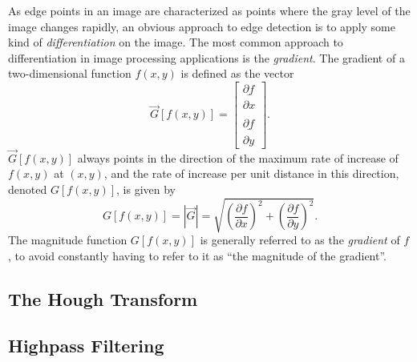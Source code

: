 As edge points in an image are characterized as points where the gray
level of the image changes rapidly, an obvious approach to edge
detection is to apply some kind of {\em differentiation\/} on the
image.  The most common approach to differentiation in image
processing applications is the {\em gradient\/}.  The gradient of a
two-dimensional function $f(x,y)$ is defined as the vector
\begin{equation}
  \vec{G}[f(x,y)]=\left[
    \begin{array}{c}
      \underline{\partial f} \\
      \partial x \\ \\
      \underline{\partial f} \\
      \partial y
    \end{array}\right]\mbox{.}
\end{equation}
$\vec{G}[f(x,y)]$ always points in the direction of the maximum rate
of increase of $f(x,y)$ at $(x,y)$, and the rate of increase per unit
distance in this direction, denoted $G[f(x,y)]$, is given by
\begin{equation}
  G[f(x,y)]=|\vec{G}|=\sqrt{(\frac{\partial f}{\partial x})^{2}+
    (\frac{\partial f}{\partial y})^{2}}\mbox{.}
\end{equation}
The magnitude function $G[f(x,y)]$ is generally referred to as the
{\em gradient\/} of $f$, to avoid constantly having to refer to it as
``the magnitude of the gradient''.

\subsection{The Hough Transform}
\label{image:edge:hough}

\subsection{Highpass Filtering}
\label{image:edge:highpass}

